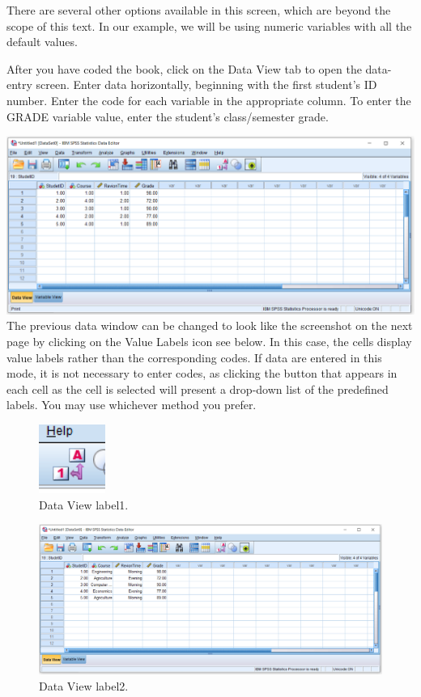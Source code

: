 \documentclass[
]{book}
\begin{document}
There are several other options available in this screen, which are beyond the scope of this text. In our example, we will be using numeric variables with all the default values.

After you have coded the book, click on the Data View tab to open the data-entry screen. Enter data horizontally, beginning with the first student's ID number. Enter the code for each variable in the appropriate column. To enter the GRADE variable value, enter the student's class/semester grade.

\includegraphics{dataview.png}
The previous data window can be changed to look like the screenshot on the next page by clicking on the Value Labels icon see below. In this case, the cells display value labels rather than the corresponding codes. If data are entered in this mode, it is not necessary to enter codes, as clicking the button that appears in each cell as the cell is selected will present a drop-down list of the predefined labels. You may use whichever method you prefer.

\begin{figure}
\centering
\includegraphics{valuelabels.png}
\caption{Data View label1.}
\end{figure}

\begin{figure}
\centering
\includegraphics{Valuelabels2.png}
\caption{Data View label2.}
\end{figure}
\end{document}
